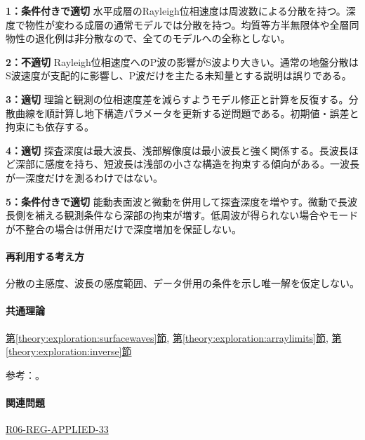 \noindent\textbf{1：条件付きで適切} 水平成層のRayleigh位相速度は周波数による分散を持つ。深度で物性が変わる成層の通常モデルでは分散を持つ。均質等方半無限体や全層同物性の退化例は非分散なので、全てのモデルへの全称としない。\par

\noindent\textbf{2：不適切} Rayleigh位相速度へのP波の影響がS波より大きい。通常の地盤分散はS波速度が支配的に影響し、P波だけを主たる未知量とする説明は誤りである。\par

\noindent\textbf{3：適切} 理論と観測の位相速度差を減らすようモデル修正と計算を反復する。分散曲線を順計算し地下構造パラメータを更新する逆問題である。初期値・誤差と拘束にも依存する。\par

\noindent\textbf{4：適切} 探査深度は最大波長、浅部解像度は最小波長と強く関係する。長波長ほど深部に感度を持ち、短波長は浅部の小さな構造を拘束する傾向がある。一波長が一深度だけを測るわけではない。\par

\noindent\textbf{5：条件付きで適切} 能動表面波と微動を併用して探査深度を増やす。微動で長波長側を補える観測条件なら深部の拘束が増す。低周波が得られない場合やモードが不整合の場合は併用だけで深度増加を保証しない。\par

\paragraph{再利用する考え方} 分散の主感度、波長の感度範囲、データ併用の条件を示し唯一解を仮定しない。

\paragraph{共通理論} \hyperref[theory:exploration:surfacewaves]{第\ref*{theory:exploration:surfacewaves}節}, \hyperref[theory:exploration:arraylimits]{第\ref*{theory:exploration:arraylimits}節}, \hyperref[theory:exploration:inverse]{第\ref*{theory:exploration:inverse}節}

\par 参考：\cite{epa_surfacewaves,xia_rayleigh1999,japansea_spac2017,array_limits2002,pygimli_inversion}。

\paragraph{関連問題} \hyperref[q:r06-reg-applied-33]{R06-REG-APPLIED-33}

